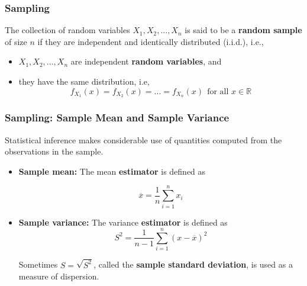 \begin{frame}
    \frametitle{Sampling}

    \begin{definition}
        The collection of random variables $X_1, X_2, ..., X_n$
        is said to be a \textbf{random sample} of size $n$ if they are independent and identically distributed (i.i.d.), i.e.,

        \begin{itemize}
            \item $X_1, X_2, ..., X_n$ are independent \textbf{random variables}, and
            \item they have the same distribution, i.e,
            $$f_{X_1}(x) = f_{X_2}(x) = ... = f_{X_n}(x)~~\text{for all $x\in\mathbb{R}$}$$
        \end{itemize}

    \end{definition}
\end{frame}



\begin{frame}
    \frametitle{Sampling: Sample Mean and Sample Variance}

    Statistical inference makes considerable use of quantities computed from the observations in the sample.
    \begin{itemize}
        \item \textbf{Sample mean:} The mean \textbf{estimator} is defined as

        $$\overline{x} = \frac{1}{n}\sum_{i=1}^{n}x_i$$

        \item \textbf{Sample variance:} The variance \textbf{estimator} is defined as
        $$S^2 = \frac{1}{n-1}\sum_{i=1}^{n}(x - \overline{x})^2$$

        Sometimes $S=\sqrt{S^2}$, called the \textbf{sample standard deviation}, is used
        as a measure of dispersion.
    \end{itemize}
\end{frame}




